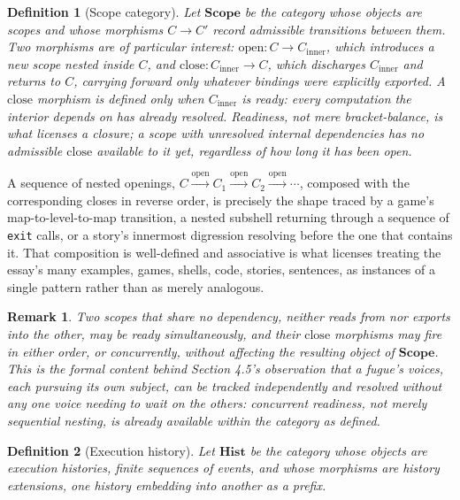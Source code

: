 \documentclass[11pt]{article}
\newtheorem{definition}{Definition}
\newtheorem{remark}{Remark}
\begin{document}
\begin{definition}[Scope category]
Let $\mathbf{Scope}$ be the category whose objects are scopes and whose morphisms $C \to C'$ record admissible transitions between them. Two morphisms are of particular interest: $\mathrm{open} : C \to C_{\mathrm{inner}}$, which introduces a new scope nested inside $C$, and $\mathrm{close} : C_{\mathrm{inner}} \to C$, which discharges $C_{\mathrm{inner}}$ and returns to $C$, carrying forward only whatever bindings were explicitly exported. A $\mathrm{close}$ morphism is defined only when $C_{\mathrm{inner}}$ is \emph{ready}: every computation the interior depends on has already resolved. Readiness, not mere bracket-balance, is what licenses a closure; a scope with unresolved internal dependencies has no admissible $\mathrm{close}$ available to it yet, regardless of how long it has been open.
\end{definition}

A sequence of nested openings, $C \xrightarrow{\mathrm{open}} C_1 \xrightarrow{\mathrm{open}} C_2 \xrightarrow{\mathrm{open}} \cdots$, composed with the corresponding closes in reverse order, is precisely the shape traced by a game's map-to-level-to-map transition, a nested subshell returning through a sequence of \texttt{exit} calls, or a story's innermost digression resolving before the one that contains it. That composition is well-defined and associative is what licenses treating the essay's many examples, games, shells, code, stories, sentences, as instances of a single pattern rather than as merely analogous.

\begin{remark}
Two scopes that share no dependency, neither reads from nor exports into the other, may be ready simultaneously, and their $\mathrm{close}$ morphisms may fire in either order, or concurrently, without affecting the resulting object of $\mathbf{Scope}$. This is the formal content behind Section 4.5's observation that a fugue's voices, each pursuing its own subject, can be tracked independently and resolved without any one voice needing to wait on the others: concurrent readiness, not merely sequential nesting, is already available within the category as defined.
\end{remark}

\begin{definition}[Execution history]
Let $\mathbf{Hist}$ be the category whose objects are execution histories, finite sequences of events, and whose morphisms are history extensions, one history embedding into another as a prefix.
\end{definition}
\end{document}

